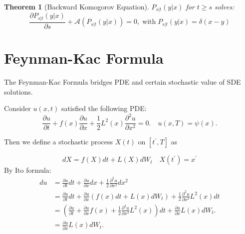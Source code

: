 \documentclass{ctexart}
\newtheorem{theorem}{Theorem}
\begin{document}
\begin{theorem}[Backward Komogorov Equation]
    $P_{s|t}(y|x)$ for $t\geq s$ solves:
    \begin{equation}
        \frac{\partial P_{s|t}(y|x)}{\partial s} + \mathcal{A}(P_{s|t}(y|x))=0, \operatorname{ with }P_{s|t}(y|x) = \delta(x-y)
    \end{equation}
\end{theorem}


\section{Feynman-Kac Formula}
The Feynman-Kac Formula bridges PDE and certain stochastic value of SDE solutions.

Consider $u(x, t)$ satisfied the following PDE:
\begin{equation}
    \frac{\partial u}{\partial t}+f(x) \frac{\partial u}{\partial x}+\frac{1}{2} L^{2}(x) \frac{\partial^{2} u}{\partial x^{2}}=0 . \quad u(x, T)=\psi(x) .
\end{equation}

Then we define a stochastic process $X(t)$  on  $\left[t^{\prime}, T\right]$  as

\begin{equation}
    d X=f(X) d t+L(X) d W_{t} \quad X\left(t^{\prime}\right)=x^{\prime}
\end{equation}
By Ito formula:
\begin{equation}
    \begin{aligned}
    d u & =\frac{\partial u}{\partial t} d t+\frac{\partial u}{\partial x} d x+\frac{1}{2} \frac{\partial^{2} u}{\partial x^{2}} d x^{2} \\
    & =\frac{\partial u}{\partial t} d t+\frac{\partial u}{\partial x}\left(f(x) d t+L(x) d W_{t}\right)+\frac{1}{2} \frac{\partial^{2} u}{\partial x^{2}} L^{2}(x) d t \\
    & =\left(\frac{\partial u}{\partial t}+\frac{\partial u}{\partial x} f(x)+\frac{1}{2} \frac{\partial^{2} u}{\partial x^{2}} L^{2}(x)\right) d t+\frac{\partial u}{\partial x} L(x) d W_{t} . \\
    & =\frac{\partial u}{\partial x} L(x) d W_{t} .
    \end{aligned}
\end{equation}
\end{document}
